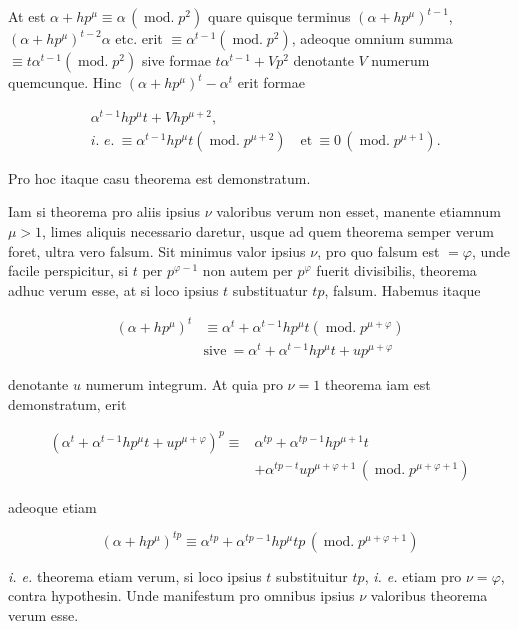 At est $\alpha+hp^{\mu}\equiv\alpha\,(\operatorname{mod.}p^2)$
quare quisque terminus $(\alpha+hp^{\mu})^{t-1}$, $(\alpha+hp^{\mu})^{t-2}\alpha$ etc. erit $\equiv\alpha^{t-1}(\operatorname{mod.}p^2)$, adeoque omnium summa $\equiv t\alpha^{t-1}(\operatorname{mod.}p^2)$ sive formae $t\alpha^{t-1}+Vp^2$ denotante $V$ numerum quemcunque. Hinc $(\alpha+hp^{\mu})^t-\alpha^t$ erit formae

\[\begin{aligned}
&\alpha^{t-1}hp^{\mu}t+Vhp^{\mu+2},\\
&\textit{i. e.}\ \equiv\alpha^{t-1}hp^{\mu}t(\operatorname{mod.}p^{\mu+2})\quad\text{et}\ \equiv0\,(\operatorname{mod.}p^{\mu+1}).
\end{aligned}\]

\noindent Pro hoc itaque casu theorema est demonstratum.

Iam si theorema pro aliis ipsius $\nu$ valoribus verum non esset, manente etiamnum $\mu>1$, limes aliquis necessario daretur, usque ad quem theorema semper verum foret, ultra vero falsum. Sit minimus valor ipsius $\nu$, pro quo falsum est $=\varphi$, unde facile perspicitur, si $t$ per $p^{\varphi-1}$ non autem per $p^{\varphi}$ fuerit divisibilis, theorema adhuc verum esse, at si loco ipsius $t$ substituatur $tp$, falsum. Habemus itaque

\[\begin{aligned}
(\alpha+hp^{\mu})^t&\equiv\alpha^t+\alpha^{t-1}hp^{\mu}t(\operatorname{mod.}p^{\mu+\varphi})\\
&\text{sive}\ =\alpha^t+\alpha^{t-1}hp^{\mu}t+up^{\mu+\varphi}
\end{aligned}\]

\noindent denotante $u$ numerum integrum. At quia pro $\nu=1$ theorema iam est demonstratum, erit

\[\begin{aligned}
(\alpha^t+\alpha^{t-1}hp^{\mu}t+up^{\mu+\varphi})^p\equiv{}&\alpha^{tp}+\alpha^{tp-1}hp^{\mu+1}t\\
&+\alpha^{tp-t}up^{\mu+\varphi+1}\,(\operatorname{mod.}p^{\mu+\varphi+1})
\end{aligned}\]

\noindent adeoque etiam

\[(\alpha+hp^{\mu})^{tp}\equiv\alpha^{tp}+\alpha^{tp-1}hp^{\mu}tp\,(\operatorname{mod.}p^{\mu+\varphi+1})\]

\noindent \emph{i. e.} theorema etiam verum, si loco ipsius $t$ substituitur $tp$, \emph{i. e.} etiam pro $\nu=\varphi$, contra hypothesin. Unde manifestum pro omnibus ipsius $\nu$ valoribus theorema verum esse.

